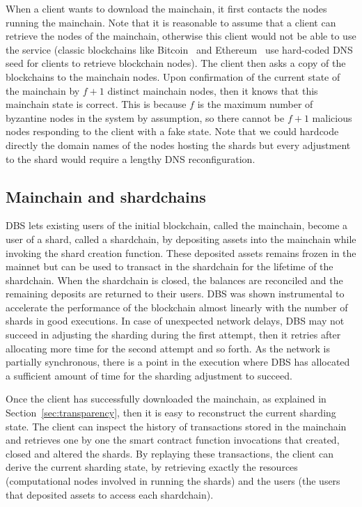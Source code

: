 \documentclass[11pt,dvipdfm]{article}
\newcommand{\deepal}[1]{\emph{Deepal: #1}}%
\begin{document}
When a client wants to download the mainchain, it first contacts the nodes running the 
mainchain. Note that it is reasonable to assume that a client can retrieve the nodes of the mainchain, otherwise
this client would not be able to use the service (classic blockchains like Bitcoin~\cite{Nak08} and Ethereum~\cite{Woo15} use hard-coded DNS seed for clients to retrieve blockchain nodes).
The client then asks a copy of the blockchains to the mainchain nodes.
Upon confirmation of the current state of the mainchain by $f+1$ distinct mainchain nodes, then it 
knows that this mainchain state is correct. This is because $f$ is the maximum number of byzantine nodes in the system by assumption, so there cannot be $f+1$ malicious nodes responding to the client with a fake state. 
Note that we could hardcode directly the domain names of the nodes hosting the shards but every adjustment to the shard would require a lengthy DNS reconfiguration.

\subsection{Mainchain and shardchains}
DBS lets existing users of the initial blockchain, called the mainchain, become a user of a shard, called a shardchain, by depositing assets into the mainchain while invoking the shard creation function. These deposited assets remains frozen in the mainnet but can be used to transact in the shardchain for the lifetime of the shardchain. When the shardchain is closed,
the balances are reconciled and the remaining deposits are returned to their users.
DBS was shown instrumental to accelerate the performance of the blockchain almost linearly with the number of shards in good executions. In case of unexpected network delays, DBS may not succeed in adjusting the sharding during the first attempt, then it retries after allocating more time for the 
second attempt and so forth. As the network is partially synchronous, there is a point in the execution
where DBS has allocated a sufficient amount of time for the sharding adjustment to succeed.

Once the client has successfully downloaded the mainchain, as explained in Section~\ref{sec:transparency}, then it is easy to reconstruct the current sharding state.
The client can inspect the history of transactions stored in the mainchain and retrieves one by one 
the smart contract function invocations that created, closed and altered the shards. By replaying these 
transactions, the client can derive the current sharding state, by retrieving exactly the resources (computational nodes involved in running the shards) and the users (the users that deposited assets to 
access each shardchain).
\end{document}
